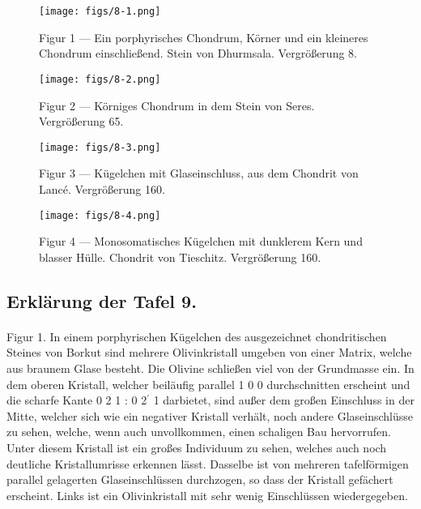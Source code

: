 \documentclass[a4paper, 12pt, oneside]{article}
\begin{document}
\vspace*{\fill}
\begin{figure}[H]
\centering
\texttt{[image: figs/8-1.png]}
\caption{\small Figur 1 --- Ein porphyrisches Chondrum, Körner und ein kleineres Chondrum einschließend. Stein von Dhurmsala. Vergrößerung 8.}
\end{figure}
\vspace*{\fill}
\clearpage

\vspace*{\fill}
\begin{figure}[H]
\centering
\texttt{[image: figs/8-2.png]}
\caption{\small Figur 2 --- Körniges Chondrum in dem Stein von Seres. Vergrößerung 65.}
\end{figure}
\vspace*{\fill}
\clearpage

\vspace*{\fill}
\begin{figure}[H]
\centering
\texttt{[image: figs/8-3.png]}
\caption{\small Figur 3 --- Kügelchen mit Glaseinschluss, aus dem Chondrit von Lancé. Vergrößerung 160.}
\end{figure}
\vspace*{\fill}
\clearpage

\vspace*{\fill}
\begin{figure}[H]
\centering
\texttt{[image: figs/8-4.png]}
\caption{\small Figur 4 --- Monosomatisches Kügelchen mit dunklerem Kern und blasser Hülle. Chondrit von Tieschitz. Vergrößerung 160.}
\end{figure}
\vspace*{\fill}
\clearpage

\subsection{Erklärung der Tafel 9.}
\paragraph{}
Figur 1. In einem porphyrischen Kügelchen des ausgezeichnet chondritischen Steines von Borkut sind mehrere Olivinkristall umgeben von einer Matrix, welche aus braunem Glase besteht. Die Olivine schließen viel von der Grundmasse ein. In dem oberen Kristall, welcher beiläufig parallel 1 0 0 durchschnitten erscheint und die scharfe Kante 0 2 1 : 0 2$^{\prime}$ 1 darbietet, sind außer dem großen Einschluss in der Mitte, welcher sich wie ein negativer Kristall verhält, noch andere Glaseinschlüsse zu sehen, welche, wenn auch unvollkommen, einen schaligen Bau hervorrufen. Unter diesem Kristall ist ein großes Individuum zu sehen, welches auch noch deutliche Kristallumrisse erkennen lässt. Dasselbe ist von mehreren tafelförmigen parallel gelagerten Glaseinschlüssen durchzogen, so dass der Kristall gefächert erscheint. Links ist ein Olivinkristall mit sehr wenig Einschlüssen wiedergegeben.
\end{document}
